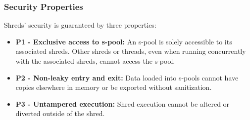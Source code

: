 %


\subsubsection{Security Properties}
Shreds' security is guaranteed by three properties: 
\begin{itemize}
\item {\bf P1 - Exclusive access to s-pool:} 
An s-pool is solely accessible to its associated shreds. Other shreds or threads, even when running concurrently with the associated shreds, cannot access the s-pool. 
\item {\bf P2 - Non-leaky entry and exit:}
Data loaded into s-pools cannot have copies elsewhere in memory or be exported without sanitization. 
\item {\bf P3 - Untampered execution:}
Shred execution cannot be altered or diverted outside of the shred. 
\end{itemize}

